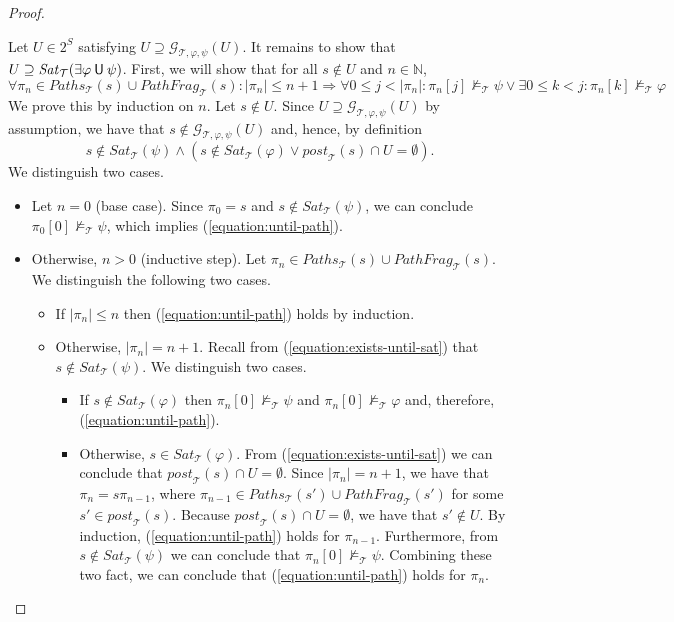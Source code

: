\documentclass[12pt]{article}
\newcommand{\until}{\mathbin{\sf U}}
\theoremstyle{definition}
\begin{document}
\begin{proof}
\begin{itemize}
Let $U \in 2^S$ satisfying $U \supseteq \mathcal{G}_{\mathcal{T}, \varphi,\psi}(U)$.  It remains to show that $U \supseteq \mathit{Sat}_{\mathcal{T}}(\exists \varphi \until \psi)$.  First, we will show that for all $s \not\in U$ and $n \in \mathbb{N}$,
\begin{equation}
\label{equation:until-path}
\forall \pi_n \in \mathit{Paths}_{\mathcal{T}}(s) \cup \mathit{PathFrag}_{\mathcal{T}}(s) : |\pi_n| \leq n + 1 \Rightarrow \forall 0 \leq j < |\pi_n| : \pi_n[j] \not\models_{\mathcal{T}} \psi \vee \exists 0 \leq k < j : \pi_n[k] \not\models_{\mathcal{T}} \varphi 
\end{equation}
We prove this by induction on $n$.  Let $s \not\in U$.  Since $U \supseteq \mathcal{G}_{\mathcal{T}, \varphi,\psi}(U)$ by assumption, we have that $s \not\in \mathcal{G}_{\mathcal{T}, \varphi,\psi}(U)$ and, hence, by definition 
\begin{equation}
\label{equation:exists-until-sat}
s \not\in \mathit{Sat}_{\mathcal{T}}(\psi) \wedge (s \not\in \mathit{Sat}_{\mathcal{T}}(\varphi) \vee \mathit{post}_{\mathcal{T}}(s) \cap U = \emptyset).  
\end{equation}
We distinguish two cases.
\begin{itemize}
\item 
Let $n = 0$ (base case).  Since $\pi_0 = s$ and $s \not\in \mathit{Sat}_{\mathcal{T}}(\psi)$, we can conclude $\pi_0[0] \not\models_{\mathcal{T}} \psi$, which implies (\ref{equation:until-path}).
\item
Otherwise, $n > 0$ (inductive step).  Let $\pi_n \in \mathit{Paths}_{\mathcal{T}}(s) \cup \mathit{PathFrag}_{\mathcal{T}}(s)$.  We distinguish the following two cases.
\begin{itemize}
\item 
If $|\pi_n| \leq n$ then (\ref{equation:until-path}) holds by induction.
\item
Otherwise, $|\pi_n| = n + 1$.  Recall from (\ref{equation:exists-until-sat}) that $s \not\in \mathit{Sat}_{\mathcal{T}}(\psi)$.  We distinguish two cases.
\begin{itemize}
\item 
If $s \not\in \mathit{Sat}_{\mathcal{T}}(\varphi)$ then $\pi_n[0] \not\models_{\mathcal{T}} \psi$ and $\pi_n[0] \not\models_{\mathcal{T}} \varphi$ and, therefore, (\ref{equation:until-path}).
\item
Otherwise, $s \in \mathit{Sat}_{\mathcal{T}}(\varphi)$.  From (\ref{equation:exists-until-sat}) we can conclude that 	$\mathit{post}_{\mathcal{T}}(s) \cap U = \emptyset$.  Since $|\pi_n| = n + 1$, we have that $\pi_n = s \pi_{n-1}$, where $\pi_{n-1} \in \mathit{Paths}_{\mathcal{T}}(s') \cup \mathit{PathFrag}_{\mathcal{T}}(s')$ for some $s' \in \mathit{post}_{\mathcal{T}}(s)$.  Because $\mathit{post}_{\mathcal{T}}(s) \cap U = \emptyset$, we have that $s' \not\in U$.  By induction, (\ref{equation:until-path}) holds for $\pi_{n-1}$.  Furthermore, from $s \not\in \mathit{Sat}_{\mathcal{T}}(\psi)$ we can conclude that $\pi_n[0] \not\models_{\mathcal{T}} \psi$.  Combining these two fact, we can conclude that (\ref{equation:until-path}) holds for $\pi_n$.

\end{itemize}
\end{itemize}
\end{itemize}
\end{itemize}
\end{proof}
\end{document}
